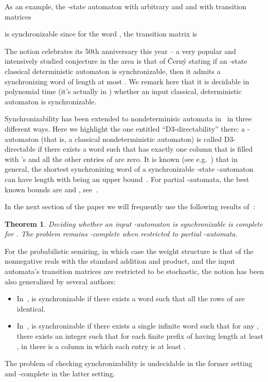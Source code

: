 \documentclass[submission,copyright,creativecommons]{eptcs}
\theoremstyle{plain}
\newtheorem{theorem}{Theorem}
\theoremstyle{definition}
\theoremstyle{remark}
\begin{document}
As an example, the -state automaton  with arbitrary  and  and with transition matrices

is synchronizable since for the word , the transition matrix is


The notion celebrates its 50th anniversary this year -- a very popular and intensively studied conjecture in the area is that of
\v{C}ern\'y stating if an -state classical deterministic automaton is synchronizable, then it admits a synchronizing word of length at most .
We remark here that it is decidable in polynomial time (it's actually in )
whether an input classical, deterministic automaton is synchronizable.

Synchronizability has been extended to nondeterminisic automata in~\cite{imreh} in three different ways.
Here we highlight the one entitled ``D3-directability'' there: a -automaton 
(that is, a classical nondeterministic automaton)
is called D3-directable if there exists a word  such that  has exactly one column that is filled with 's and
all the other entries of  are zero.
It is known (see e.g.~\cite{imreh}) that in general, the shortest synchronizing word of a synchronizable -state -automaton
can have length  with  being an upper bound~\cite{gazdag}.
For partial -automata, the best known bounds are  and , see~\cite{martyugin-bound,gazdag}.

In the next section of the paper we will frequently use the following results of~\cite{martyugin-pspace}:
\begin{theorem}
\label{thm-marty}
Deciding whether an input -automaton is synchronizable is complete for .
The problem remains -complete when restricted to partial -automata.
\end{theorem}

For the probabilistic semiring, in which case the weight structure is that of the nonnegative reals with the standard addition and product,
and the input automata's transition matrices are restricted to be stochastic, the notion has been also generalized by several authors:
\begin{itemize}
\item In~\cite{kfouri},  is synchronizable if there exists a word  such that all the rows of  are identical.
\item In~\cite{doyen},  is synchronizable if there exists a single infinite word  such that for any ,
  there exists an integer  such that for each finite prefix  of  having length at least ,
  in  there is a column in which each entry is at least .
\end{itemize}
The problem of checking synchronizability is undecidable in the former setting and -complete in the latter setting.
\end{document}
